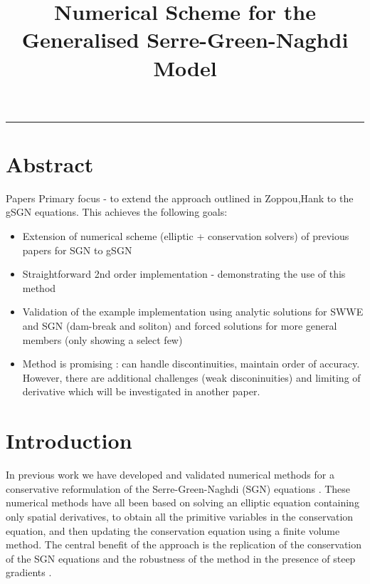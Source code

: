 \documentclass[10pt]{elsarticle}
\title{Numerical Scheme for the Generalised Serre-Green-Naghdi Model}
\begin{document}
\maketitle

\vspace{-0.3in}
\noindent
\rule{\linewidth}{0.4pt}

\tableofcontents

\section{Abstract}

Papers Primary focus - to extend the approach outlined in Zoppou,Hank to the gSGN equations. This achieves the following goals:
\begin{itemize}
	\item Extension of numerical scheme (elliptic + conservation solvers) of previous papers for SGN to gSGN
	\item Straightforward 2nd order implementation - demonstrating the use of this method
	\item Validation of the example implementation using analytic solutions for SWWE and SGN (dam-break and soliton) and forced solutions for more general members (only showing a select few)
	\item Method is promising : can handle discontinuities, maintain order of accuracy. However, there are additional challenges (weak disconinuities) and limiting of derivative which will be investigated in another paper. 
\end{itemize}



\section{Introduction}
In previous work we have developed and validated numerical methods for a conservative reformulation of the Serre-Green-Naghdi (SGN) equations \cite{Zoppou-2014,Zoppou-etal-2016,Zoppou-etal-2017,Pitt-2019}. These numerical methods have all been based on solving an elliptic equation containing only spatial derivatives, to obtain all the primitive variables in the conservation equation, and then updating the conservation equation using a finite volume method. The central benefit of the approach is the replication of the conservation of the SGN equations \cite{Pitt-2019} and the robustness of the method in the presence of steep gradients \cite{Pitt-2018-61}. 
\end{document}
